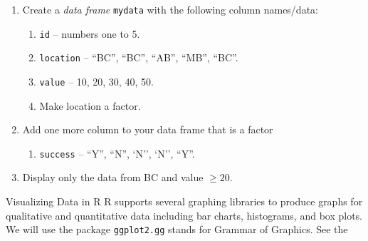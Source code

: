 \documentclass[xcolor=svgnames, 10pt, handout]{beamer}
\begin{document}
\begin{frame}[fragile]

\begin{question}
\begin{enumerate}
\item Create a \emph{data frame} \verb|mydata| with the following column names/data:
\begin{enumerate}
\item \verb|id| -- numbers one to 5.
\item \verb|location| -- ``BC'', ``BC'', ``AB'', ``MB'', ``BC''.
\item \verb|value| -- 10, 20, 30, 40, 50.
\item Make location a factor.
\end{enumerate}
\item Add one more column to your data frame that is a factor
\begin{enumerate}
\item \verb|success| -- ``Y'', ``N'', `N'', `N'', ``Y''.
\end{enumerate}
\item Display only the data from BC and value $\geq 20$.
\end{enumerate}
\end{question}

\end{frame}


\begin{frame}[fragile]{Visualizing Data in R}
R supports several graphing libraries to produce graphs for qualitative and quantitative data including bar charts, histograms, and box plots.
\vfill
We will use the package \verb|ggplot2.gg| stands for Grammar of Graphics.
\vfill
See the \href{https://www.rstudio.com/wp-content/uploads/2015/03/ggplot2-cheatsheet.pdf}{}
\end{frame}
\end{document}
